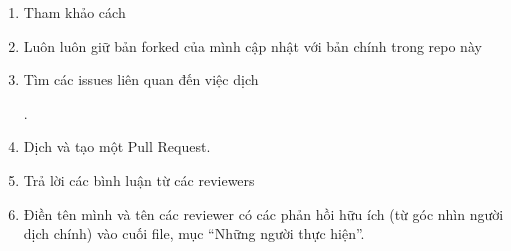 \documentclass[letterpaper,11pt,english]{sphinxmanual}
\begin{document}
\begin{enumerate}
%
\item {} 
Tham khảo cách %
\begin{footnote}[10]\sphinxAtStartFootnote
{}
%
\end{footnote}

\item {} 
Luôn luôn giữ bản forked của mình cập nhật với bản chính trong repo
này

\item {} 
Tìm các issues liên quan đến việc dịch %
\begin{footnote}[11]\sphinxAtStartFootnote
{}
%
\end{footnote}.

\item {} 
Dịch và tạo một Pull Request.

\item {} 
Trả lời các bình luận từ các reviewers

\item {} 
Điền tên mình và tên các reviewer có các phản hồi hữu ích (từ góc
nhìn người dịch chính) vào cuối file, mục “Những người thực hiện”.

\end{enumerate}
\end{document}
